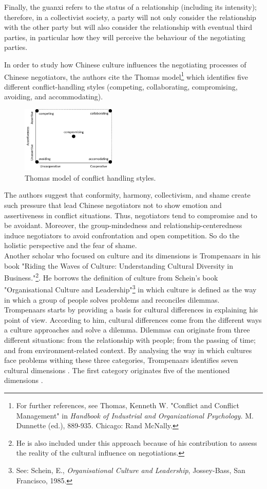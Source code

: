 \documentclass[../main.tex]{subfiles}
\begin{document}
Finally, the guanxi refers to the status of a relationship (including its intensity); therefore, in a collectivist society, a party will not only consider the relationship with the other party but will also consider the relationship with eventual third parties, in particular how they will perceive the behaviour of the negotiating parties.

In order to study how Chinese culture influences the negotiating processes of Chinese negotiators, the authors cite the Thomas model\footnote{For further references, see Thomas, Kenneth W. "Conflict and Conflict Management" in \textit{Handbook of Industrial and Organizational Psychology.} M. Dunnette (ed.), 889-935. Chicago: Rand McNally.} which identifies five different conflict-handling styles (competing, collaborating, compromising, avoiding, and accommodating).

\begin{figure}[h]
    \centering\includegraphics[width=0.40\textwidth]{images/thomas.png}
    \caption{Thomas model of conflict handling styles.}
\end{figure}

The authors suggest that conformity, harmony, collectivism, and shame create such pressure that lead Chinese negotiators not to show emotion and assertiveness in conflict situations. Thus, negotiators tend to compromise and to be avoidant. Moreover, the group-mindedness and relationship-centeredness induce negotiators to avoid confrontation and open competition. So do the holistic perspective and the fear of shame.\\

Another scholar who focused on culture and its dimensions is Trompenaars in his book "Riding the Waves of Culture: Understanding Cultural Diversity in Business."\footnote{He is also included under this approach because of his contribution to assess the reality of the cultural influence on negotiations.}. He borrows the definition of culture from Schein's book "Organisational Culture and Leadership"\footnote{See: Schein, E., \textit{Organisational Culture and Leadership}, Jossey-Bass, San Francisco, 1985.} in which culture is defined as the way in which a group of people solves problems and reconciles dilemmas. Trompenaars starts by providing a basis for cultural differences in explaining his point of view. According to him, cultural differences come from the different ways a culture approaches and solve a dilemma. Dilemmas can originate from three different situations: from the relationship with people; from the passing of time; and from environment-related context. By analysing the way in which cultures face problems withing these three categories, Trompenaars identifies seven cultural dimensions . The first category originates five of the mentioned dimensions \autocite[8]{trompenaars}.
\end{document}
